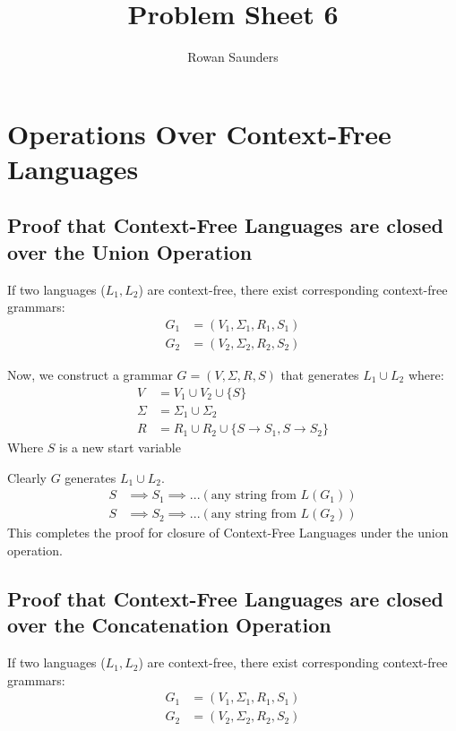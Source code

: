 \documentclass[11pt]{article}
\title{Problem Sheet 6}
\author{Rowan Saunders}
\begin{document}
\begin{titlepage}
	\maketitle
\end{titlepage}

\section{Operations Over Context-Free Languages}

\subsection{Proof that Context-Free Languages are closed over the Union
Operation}
If two languages ($L_1, L_2$) are context-free, there exist corresponding
context-free grammars:
\begin{align*}
	G_1 &= (V_1,\Sigma_1, R_1,S_1)\\
	G_2 &= (V_2,\Sigma_2, R_2,S_2)
\end{align*}

Now, we construct a grammar $G=(V,\Sigma,R,S)$ that generates $L_1 \cup L_2$
where:
\begin{align*}
	V &= V_1 \cup V_2 \cup \{S\} \\
	\Sigma &= \Sigma_1 \cup \Sigma_2 \\
	R &= R_1 \cup R_2 \cup \{S \to S_1, S \to S_2 \}
\end{align*}
Where $S$ is a new start variable

Clearly $G$ generates $L_1 \cup L_2$.
\begin{align*}
	S & \implies S_1 \implies ... (\text{any string from }L(G_1)) \\
	S & \implies S_2 \implies ... (\text{any string from }L(G_2))
\end{align*}
This completes the proof for closure of Context-Free Languages under the union
operation.

\subsection{Proof that Context-Free Languages are closed over the Concatenation
Operation}
If two languages ($L_1, L_2$) are context-free, there exist corresponding
context-free grammars:
\begin{align*}
	G_1 &= (V_1,\Sigma_1, R_1,S_1)\\
	G_2 &= (V_2,\Sigma_2, R_2,S_2)
\end{align*}
\end{document}
